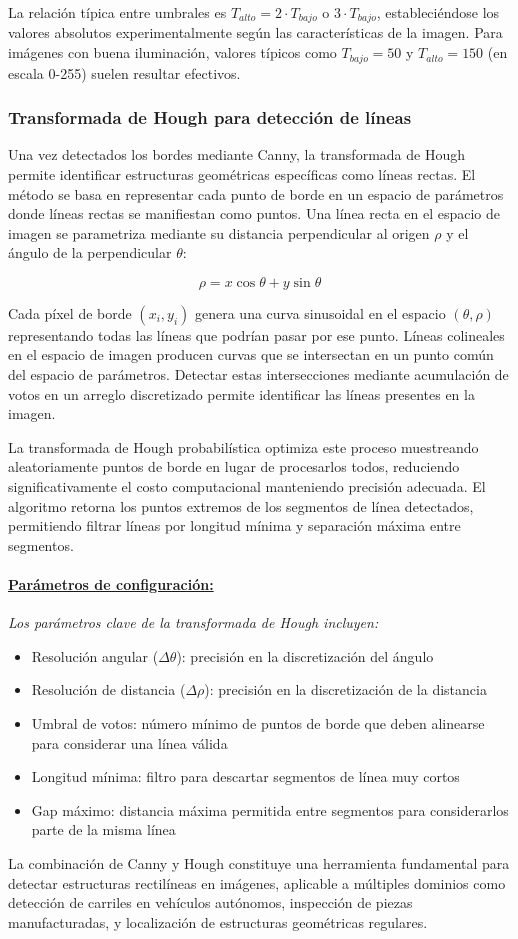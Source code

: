 La relación típica entre umbrales es $T_{alto} = 2 \cdot T_{bajo}$ o $3 \cdot T_{bajo}$, estableciéndose los valores absolutos experimentalmente según las características de la imagen. Para imágenes con buena iluminación, valores típicos como $T_{bajo} = 50$ y $T_{alto} = 150$ (en escala 0-255) suelen resultar efectivos.

\subsubsection{Transformada de Hough para detección de líneas}

Una vez detectados los bordes mediante Canny, la transformada de Hough permite identificar estructuras geométricas específicas como líneas rectas. El método se basa en representar cada punto de borde en un espacio de parámetros donde líneas rectas se manifiestan como puntos. Una línea recta en el espacio de imagen se parametriza mediante su distancia perpendicular al origen $\rho$ y el ángulo de la perpendicular $\theta$:

\begin{equation}
\rho = x \cos\theta + y \sin\theta
\end{equation}

Cada píxel de borde $(x_i, y_i)$ genera una curva sinusoidal en el espacio $(\theta, \rho)$ representando todas las líneas que podrían pasar por ese punto. Líneas colineales en el espacio de imagen producen curvas que se intersectan en un punto común del espacio de parámetros. Detectar estas intersecciones mediante acumulación de votos en un arreglo discretizado permite identificar las líneas presentes en la imagen.

La transformada de Hough probabilística optimiza este proceso muestreando aleatoriamente puntos de borde en lugar de procesarlos todos, reduciendo significativamente el costo computacional manteniendo precisión adecuada. El algoritmo retorna los puntos extremos de los segmentos de línea detectados, permitiendo filtrar líneas por longitud mínima y separación máxima entre segmentos.

\paragraph{\underline{Parámetros de configuración:}} \textit{Los parámetros clave de la transformada de Hough incluyen:}
\begin{itemize}[label=$\bullet$]
\item Resolución angular ($\Delta\theta$): precisión en la discretización del ángulo
\item Resolución de distancia ($\Delta\rho$): precisión en la discretización de la distancia
\item Umbral de votos: número mínimo de puntos de borde que deben alinearse para considerar una línea válida
\item Longitud mínima: filtro para descartar segmentos de línea muy cortos
\item Gap máximo: distancia máxima permitida entre segmentos para considerarlos parte de la misma línea
\end{itemize}

La combinación de Canny y Hough constituye una herramienta fundamental para detectar estructuras rectilíneas en imágenes, aplicable a múltiples dominios como detección de carriles en vehículos autónomos, inspección de piezas manufacturadas, y localización de estructuras geométricas regulares.
